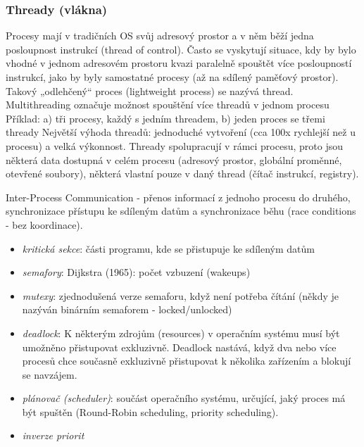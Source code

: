 \subsubsection*{Thready (vlákna)}
Procesy mají v tradičních OS svůj adresový prostor a v něm běží jedna posloupnost instrukcí (thread of control). Často se vyskytují situace, kdy by bylo vhodné v jednom adresovém prostoru kvazi paralelně spouštět více posloupností instrukcí, jako by byly samostatné procesy (až na sdílený paměťový prostor). Takový „odlehčený“ proces (lightweight process) se nazývá thread. Multithreading označuje možnost spouštění více threadů v jednom procesu Příklad: a) tři procesy, každý s jedním threadem, b) jeden proces se třemi thready Největší výhoda threadů: jednoduché vytvoření (cca 100x rychlejší než u procesu) a velká výkonnost. Thready spolupracují v rámci procesu, proto jsou některá data dostupná v celém procesu (adresový prostor, globální proměnné, otevřené soubory), některá vlastní pouze v daný thread (čítač instrukcí, registry).

Inter-Process Communication - přenos informací z jednoho procesu do druhého, synchronizace přístupu ke sdíleným datům a synchronizace běhu (race conditions - bez koordinace).
\begin{itemize}
\item \textit{kritická sekce}: části programu, kde se přistupuje ke sdíleným datům
\item \textit{semafory}: Dijkstra (1965): počet vzbuzení (wakeups)
\item \textit{mutexy}: zjednodušená verze semaforu, když není potřeba čítání (někdy je nazýván binárním semaforem - locked/unlocked)
\item \textit{deadlock}: K některým zdrojům (resources) v operačním systému musí být umožněno přistupovat exkluzivně. Deadlock nastává, když dva nebo více procesů chce současně exkluzivně přistupovat k několika zařízením a blokují se navzájem.
\item \textit{plánovač (scheduler)}: součást operačního systému, určující, jaký proces má být spuštěn (Round-Robin scheduling, priority scheduling).
\item \textit{inverze priorit}
\end{itemize}

